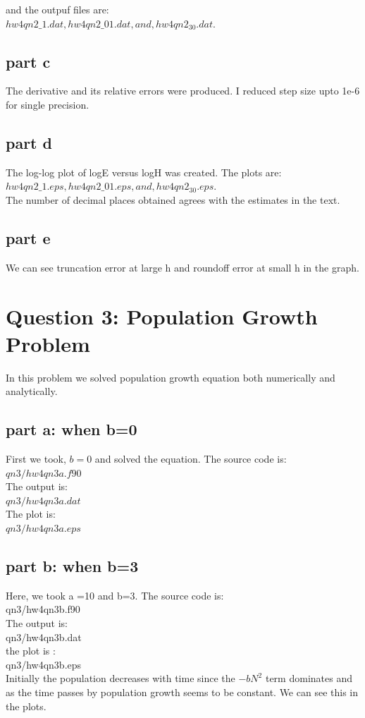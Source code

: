 \documentclass[11pt,a4paper,english]{article}
\begin{document}
and the outpuf files are:\\
$hw4qn2\_1.dat, hw4qn2\_01.dat,and, hw4qn2_30.dat.$\\

\subsection{part c}
The derivative and its relative errors were produced.
I reduced step size upto 1e-6 for single precision.

\subsection{part d}
The log-log plot of logE versus logH was created.
The plots are:\\
$hw4qn2\_1.eps, hw4qn2\_01.eps,and, hw4qn2_30.eps.$\\
The number of decimal places obtained agrees with the estimates in the text.

\subsection{part e}
We can see truncation error at large h and roundoff error at small h in the graph.


\section{Question 3: Population Growth Problem}
In this problem we solved population growth equation both numerically and analytically.
\subsection{part a: when b=0}
First we took, $b=0$ and solved the equation.
The source code is:\\
$qn3/hw4qn3a.f90$\\

The output is:\\
$qn3/hw4qn3a.dat$\\

The plot is:\\
$qn3/hw4qn3a.eps$\\
\clearpage

\subsection{part b: when b=3}
Here, we took a =10 and b=3.
The source code is:\\
qn3/hw4qn3b.f90\\

The output is:\\
qn3/hw4qn3b.dat\\

the plot is :\\
qn3/hw4qn3b.eps\\


Initially the population decreases with time since the $-bN^2$ term dominates and as the 
time passes by population growth seems to be constant. We can see this in the plots.
\end{document}
